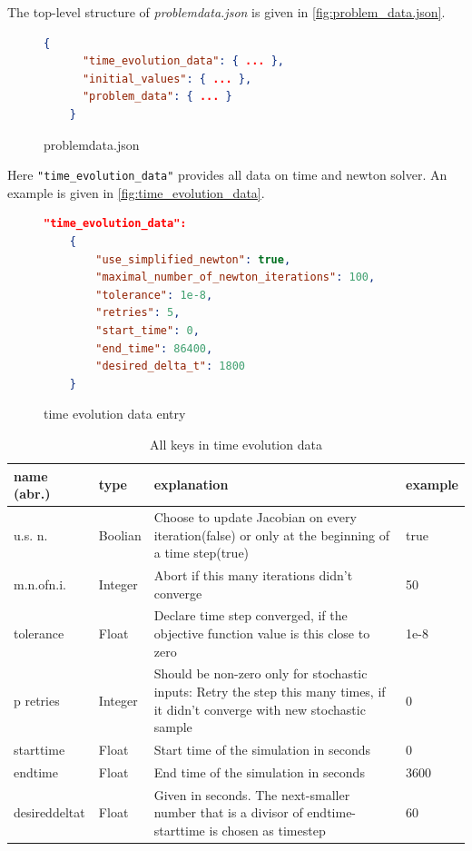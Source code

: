 \documentclass[a4paper]{article}
\newcommand{\sco
}{\textunderscore{}}
\begin{document}
The top-level structure of \emph{problem\sco data.json} is given in
\autoref{fig:problem_data.json}.
\begin{figure}[ht]
  \centering
  \begin{lstlisting}[language=json,firstnumber=1]
    {
      "time_evolution_data": { ... },
      "initial_values": { ... },
      "problem_data": { ... }
    }
  \end{lstlisting}
  \caption{problem\sco data.json}
  \label{fig:problem_data.json}
\end{figure}
Here \verb|"time_evolution_data"| provides all data on time and newton solver.
An example is given in \autoref{fig:time_evolution_data}.
\begin{figure}[ht]
  \centering
\begin{lstlisting}[language=json,firstnumber=1]
    "time_evolution_data":
    {
        "use_simplified_newton": true,
        "maximal_number_of_newton_iterations": 100,
        "tolerance": 1e-8,
        "retries": 5,
        "start_time": 0,
        "end_time": 86400,
        "desired_delta_t": 1800
    }
\end{lstlisting}
  \caption{time evolution data entry}
  \label{fig:time_evolution_data}
\end{figure}

\begin{table}[ht]
  \centering
  \begin{tabularx}{\textwidth}{llXl}
    \toprule name (abr.) & type & explanation &example \\
 \midrule u.\sco s.\sco
n.&Boolian& Choose to update Jacobian on every iteration(false) or only at the
beginning of a time step(true)& true \\
 m.\sco n.\sco of\sco n.\sco i. &Integer&Abort if this many iterations didn't
converge & 50\\
 tolerance&Float& Declare time step converged, if the objective function value
is this close to zero&1e-8\\
 p retries&Integer& Should be non-zero only for stochastic inputs: Retry the
step this many times, if it didn't converge with new stochastic sample & 0\\
start\sco time&Float& Start time of the simulation in seconds& 0\\
 end\sco time&Float& End time of the simulation in seconds& 3600\\
 desired\sco delta\sco t&Float& Given in seconds. The next-smaller number that
is a divisor of endtime-starttime is chosen as timestep & 60\\

    \bottomrule
  \end{tabularx}
  \caption{All keys in time evolution data}
  \label{tab:time_evolution_data}
\end{table}
\end{document}
